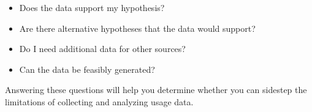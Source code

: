 \begin{itemize}[noitemsep]
  \item Does the data support my hypothesis?
  \item Are there alternative hypotheses that the data would support?
  \item Do I need additional data for other sources?
  \item Can the data be feasibly generated?
\end{itemize}

\noindent
Answering these questions will help you determine whether you can sidestep
the limitations of collecting and analyzing usage data.

%
%
%

